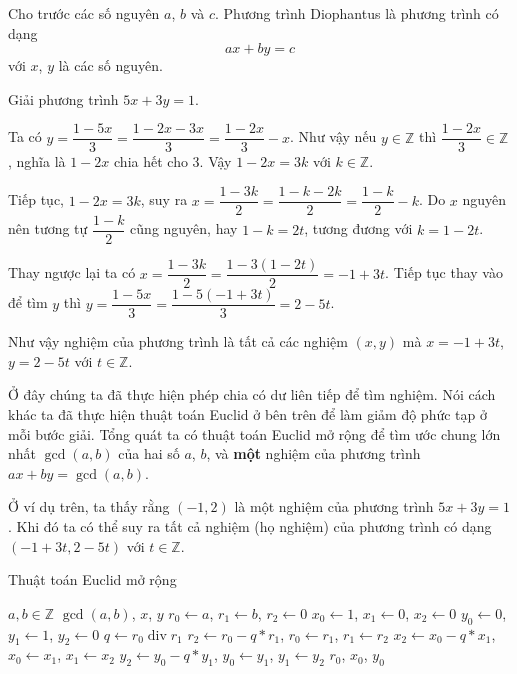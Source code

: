 \documentclass{mynotes}
\newcommand{\ZZ}{\mathbb{Z}}
\begin{document}
\begin{definition}
    Cho trước các số nguyên $a$, $b$ và $c$. Phương trình  Diophantus là phương trình có dạng
    \[ax + by = c\]
    với $x$, $y$ là các số nguyên.
\end{definition}

\begin{example}
    Giải phương trình $5x+3y = 1$.

    Ta có $y = \dfrac{1-5x}{3} = \dfrac{1-2x-3x}{3} = \dfrac{1-2x}{3} - x$. Như vậy nếu $y \in \ZZ$ thì $\dfrac{1-2x}{3} \in \ZZ$, nghĩa là $1-2x$ chia hết cho 3. Vậy $1-2x = 3k$ với $k \in \ZZ$.

    Tiếp tục, $1-2x = 3k$, suy ra $x = \dfrac{1-3k}{2}  = \dfrac{1-k-2k}{2} = \dfrac{1-k}{2} - k$. Do $x$ nguyên nên tương tự $\dfrac{1-k}{2}$ cũng nguyên, hay $1-k = 2t$, tương đương với $k = 1-2t$.

    Thay ngược lại ta có $x = \dfrac{1-3k}{2} = \dfrac{1-3(1-2t)}{2} = {-1+3t}$. Tiếp tục thay vào để tìm $y$ thì $y = \dfrac{1-5x}{3} = \dfrac{1-5(-1+3t)}{3} = 2 - 5t$.

    Như vậy nghiệm của phương trình là tất cả các nghiệm $(x, y)$ mà $x = -1+3t$, $y = 2-5t$ với $t \in \ZZ$.
\end{example}

Ở đây chúng ta đã thực hiện phép chia có dư liên tiếp để tìm nghiệm. Nói cách khác ta đã thực hiện thuật toán Euclid ở bên trên để làm giảm độ phức tạp ở mỗi bước giải. Tổng quát ta có thuật toán Euclid mở rộng để tìm ước chung lớn nhất $\gcd(a, b)$ của hai số $a$, $b$, và \textbf{một} nghiệm của phương trình $ax + by = \gcd(a, b)$.

Ở ví dụ trên, ta thấy rằng $(-1, 2)$ là một nghiệm của phương trình $5x + 3y = 1$. Khi đó ta có thể suy ra tất cả nghiệm (họ nghiệm) của phương trình có dạng $(-1+3t, 2-5t)$ với $t \in \ZZ$.

\begin{algorithm}
    \caption{Thuật toán Euclid mở rộng}
    \begin{algorithmic}
        \Require $a, b \in \ZZ$
        \Ensure $\gcd(a, b)$, $x$, $y$ 
        \State $r_0 \gets a$, $r_1 \gets b$, $r_2 \gets 0$
        \State $x_0 \gets 1$, $x_1 \gets 0$, $x_2 \gets 0$
        \State $y_0 \gets 0$, $y_1 \gets 1$, $y_2 \gets 0$
            \State $q \gets r_0 \;\text{div}\; r_1$
            \State $r_2 \gets r_0 - q * r_1$, $r_0 \gets r_1$, $r_1 \gets r_2$
            \State $x_2 \gets x_0 - q * x_1$, $x_0 \gets x_1$, $x_1 \gets x_2$
            \State $y_2 \gets y_0 - q * y_1$, $y_0 \gets y_1$, $y_1 \gets y_2$
        \EndWhile
        \State \Return $r_0$, $x_0$, $y_0$
    \end{algorithmic}
\end{algorithm}
\end{document}
